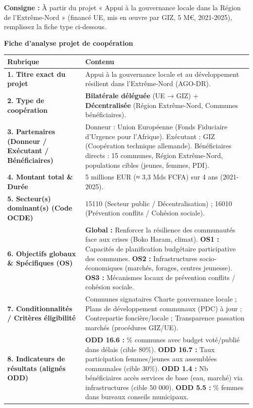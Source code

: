 \documentclass[11pt]{article}
\begin{document}
\begin{exoresolu}
\textbf{Consigne :} À partir du projet « Appui à la gouvernance locale dans la Région de l'Extrême-Nord » (financé UE, mis en œuvre par GIZ, 5 M€, 2021-2025), remplissez la fiche type ci-dessous.

\textbf{Fiche d'analyse projet de coopération}

\begin{center}
\begin{tabularx}{\linewidth}{|l|X|}\hline
\rowcolor{popblueL}
\textbf{Rubrique} & \textbf{Contenu} \\ \hline
\textbf{1. Titre exact du projet} & Appui à la gouvernance locale et au développement résilient dans l'Extrême-Nord (AGO-DR). \\ \hline
\textbf{2. Type de coopération} & \textbf{Bilatérale déléguée} (UE → GIZ) + \textbf{Décentralisée} (Région Extrême-Nord, Communes bénéficiaires). \\ \hline
\textbf{3. Partenaires (Donneur / Exécutant / Bénéficiaires)} & Donneur : Union Européenne (Fonds Fiduciaire d'Urgence pour l'Afrique). Exécutant : GIZ (Coopération technique allemande). Bénéficiaires directs : 15 communes, Région Extrême-Nord, populations cibles (jeunes, femmes, PDI). \\ \hline
\textbf{4. Montant total \& Durée} & 5 millions EUR (≈ 3,3 Mds FCFA) sur 4 ans (2021-2025). \\ \hline
\textbf{5. Secteur(s) dominant(s) (Code OCDE)} & 15110 (Secteur public / Décentralisation) ; 16010 (Prévention conflits / Cohésion sociale). \\ \hline
\textbf{6. Objectifs globaux \& Spécifiques (OS)} & \textbf{Global :} Renforcer la résilience des communautés face aux crises (Boko Haram, climat). \textbf{OS1 :} Capacités de planification budgétaire participative des communes. \textbf{OS2 :} Infrastructures socio-économiques (marchés, forages, centres jeunesse). \textbf{OS3 :} Mécanismes locaux de prévention conflits / cohésion sociale. \\ \hline
\textbf{7. Conditionnalités / Critères éligibilité} & Communes signataires Charte gouvernance locale ; Plans de développement communaux (PDC) à jour ; Contrepartie foncière/locale ; Transparence passation marchés (procédures GIZ/UE). \\ \hline
\textbf{8. Indicateurs de résultats (alignés ODD)} & \textbf{ODD 16.6 :} \% communes avec budget voté/publié dans délais (cible 80\%). \textbf{ODD 16.7 :} Taux participation femmes/jeunes aux assemblées communales (cible 30\%). \textbf{ODD 1.4 :} Nb bénéficiaires accès services de base (eau, marché) via infrastructures (cible 50 000). \textbf{ODD 5.5 :} \% femmes dans bureaux conseils municipaux. \\ \hline

\end{tabularx}
\end{center}
\end{exoresolu}
\end{document}
